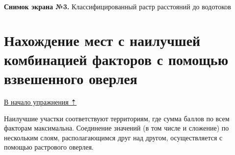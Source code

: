 \documentclass[12pt,]{book}
\begin{document}
\textbf{Снимок экрана №3.} Классифицированный растр расстояний до водотоков

\hypertarget{weighted-overlay-combination}{%
\section{Нахождение мест с наилучшей комбинацией факторов с помощью взвешенного оверлея}\label{weighted-overlay-combination}}

\protect\hyperlink{weighted-overlay}{В начало упражнения ⇡}

Наилучшие участки соответствуют территориям, где сумма баллов по всем факторам максимальна. Соединение значений (в том числе и сложение) по нескольким слоям, располагающимся друг над другом, осуществляется с помощью растрового оверлея.
\end{document}
